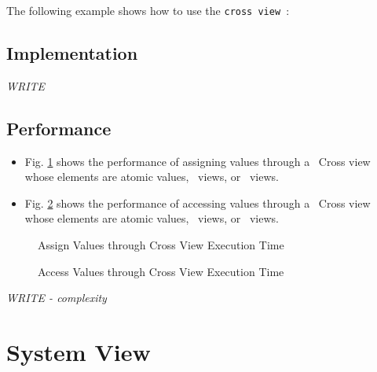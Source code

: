 The following example shows how to use the \texttt{cross view }:


\subsection{Implementation} \label{sec-cross-vw-impl}

\textit{WRITE}

\subsection{Performance} \label{sec-cross-vw-perf}

\begin{itemize}
\item
Fig. \ref{fig:cross-vw-assign-exper}
shows the performance of assigning values through a \stapl\ Cross view
whose elements are atomic values, \stl\ views, or \stapl\ views.
\item
Fig. \ref{fig:cross-vw-access-exper}
shows the performance of accessing values through a \stapl\ Cross view
whose elements are atomic values, \stl\ views, or \stapl\ views.
\end{itemize}

\begin{figure}[p]
\caption{Assign Values through Cross View Execution Time}
\label{fig:cross-vw-assign-exper}
\end{figure}

\begin{figure}[p]
\caption{Access Values through Cross View Execution Time}
\label{fig:cross-vw-access-exper}
\end{figure}

\emph{WRITE - complexity}


\section{System View} \label{sec-dist-sys-vw}

